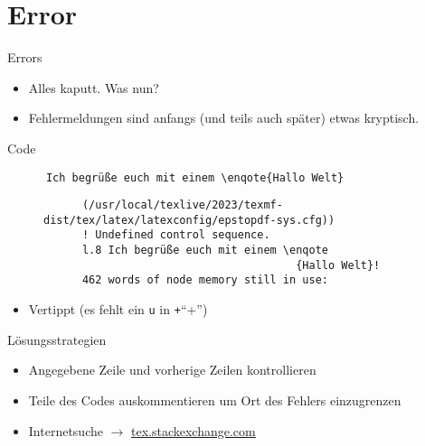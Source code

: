 \section{Error}
\begin{frame}[fragile]{Errors}
  \begin{itemize}
    \item Alles kaputt. Was nun?
    \item Fehlermeldungen sind anfangs (und teils auch später) etwas kryptisch.
  \end{itemize}
  \begin{block}{Code}
    \begin{verbatim}
      Ich begrüße euch mit einem \enqote{Hallo Welt}
    \end{verbatim}
  \end{block}
  \begin{figure}
    \centering
    \begin{verbatim}
      (/usr/local/texlive/2023/texmf-dist/tex/latex/latexconfig/epstopdf-sys.cfg))
      ! Undefined control sequence.
      l.8 Ich begrüße euch mit einem \enqote
                                       {Hallo Welt}!
      462 words of node memory still in use:
    \end{verbatim}
  \end{figure}
  \huge
  \begin{itemize}
    \item<2->[$\Rightarrow$] Vertippt (es fehlt ein \verb+u+ in \texttt+\enquote+)
  \end{itemize}
\end{frame}

\begin{frame}{Lösungsstrategien}
  \Large
  \begin{itemize}
    \item Angegebene Zeile und vorherige Zeilen kontrollieren
    \item Teile des Codes auskommentieren um Ort des Fehlers einzugrenzen
    \item Internetsuche $\rightarrow$ \href{http://tex.stackexchange.com}{tex.stackexchange.com}
  \end{itemize}
\end{frame}
